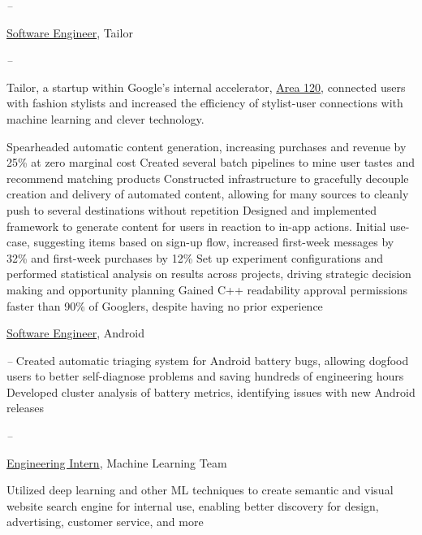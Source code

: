 \documentclass[letterpaper,nonstopmode]{simpleresumecv}
\begin{document}
\begin{Body}
\Entry
{}
\hfill \textit{ -- }
\SmallGap
\begin{Position}\underline{Software Engineer}, Tailor\end{Position}
\hfill \textit{ -- }
\Gap
\begin{Detail} Tailor, a startup within Google's internal accelerator, \href{http://area120.google.com}{Area 120}, connected users with fashion stylists and increased the efficiency of stylist-user connections with machine learning and clever technology.
\end{Detail}
\SmallGap
\BulletItem Spearheaded automatic content generation, increasing purchases and revenue by 25\% at zero marginal cost
\SubBulletItem Created several batch pipelines to mine user tastes and recommend matching products
\SubBulletItem Constructed infrastructure to gracefully decouple creation and delivery of automated content, allowing for many sources to cleanly push to several destinations without repetition 
\BulletItem Designed and implemented framework to generate content for users in reaction to in-app actions. Initial use-case, suggesting items based on sign-up flow, increased first-week messages by 32\% and first-week purchases by 12\%
\BulletItem Set up experiment configurations and performed statistical analysis on results across projects, driving strategic decision making and opportunity planning
\BulletItem Gained C++ readability approval permissions faster than 90\% of Googlers, despite having no prior experience

\Gap
\begin{Position}\underline{Software Engineer}, Android\end{Position}
\hfill \textit{ -- }
\SmallGap
\BulletItem Created automatic triaging system for Android battery bugs, allowing dogfood users to better self-diagnose problems and saving hundreds of engineering hours
\BulletItem Developed cluster analysis of battery metrics, identifying issues with new Android releases

\BigGap
\Entry
{}
\hfill \textit{ -- }
\SmallGap
\begin{Position}\underline{Engineering Intern}, Machine Learning Team\end{Position}
\SmallGap
\BulletItem Utilized deep learning and other ML techniques to create semantic and visual website search engine for internal use, enabling better discovery for design, advertising, customer service, and more


\end{Body}
\end{document}
